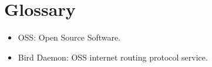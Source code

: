 \chapter*{Glossary}

\begin{itemize}
	\item OSS: Open Source Software.
	\item Bird Daemon: OSS internet routing protocol service.
\end{itemize}